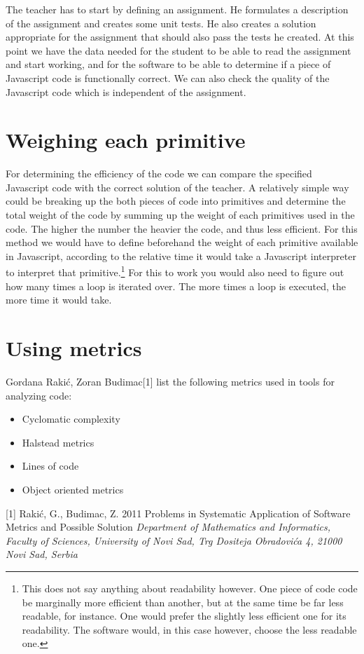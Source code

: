 \documentclass{article}
\begin{document}
The teacher has to start by defining an assignment. He formulates a description
of the assignment and creates some unit tests. He also creates a solution
appropriate for the assignment that should also pass the tests he created. At
this point we have the data needed for the student to be able to read the
assignment and start working, and for the software to be able to determine if a
piece of Javascript code is functionally correct. We can also check the quality
of the Javascript code which is independent of the assignment.

\section{Weighing each primitive}

For determining the efficiency of the code we can compare the specified
Javascript code with the correct solution of the teacher. A relatively simple
way could be breaking up the both pieces of code into primitives and determine
the total weight of the code by summing up the weight of each primitives used
in the code. The higher the number the heavier the code, and thus less
efficient. For this method we would have to define beforehand the weight of
each primitive available in Javascript, according to the relative time it would
take a Javascript interpreter to interpret that primitive.\footnote{This does
not say anything about readability however. One piece of code code be
marginally more efficient than another, but at the same time be far less
readable, for instance. One would prefer the slightly less efficient one for
its readability. The software would, in this case however, choose the less
readable one.} For this to work you would also need to figure out how many
times a loop is iterated over. The more times a loop is executed, the more time
it would take.

\section{Using metrics}

Gordana Rakić, Zoran Budimac[1] list the following metrics used in tools for analyzing code:

\begin{itemize}
  \item Cyclomatic complexity
  \item Halstead metrics
  \item Lines of code
  \item Object oriented metrics
\end{itemize}

[1] Rakić, G., Budimac, Z. 2011 Problems in Systematic Application of Software
Metrics and Possible Solution {\em Department of Mathematics and Informatics,
Faculty of Sciences, University of Novi Sad, Trg Dositeja Obradovića 4, 21000
Novi Sad, Serbia}
\end{document}
